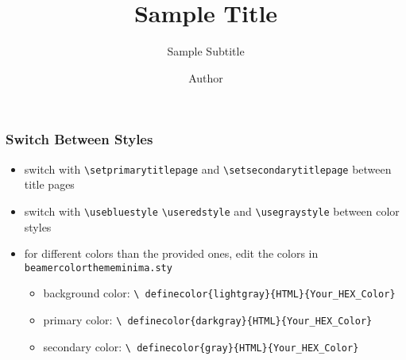 \title{Sample Title}
\subtitle{Sample Subtitle}
\author{Author}

\usebluestyle



	\setsecondayrtitlepage
	\begin{frame}
		\titlepage
	\end{frame}

	\setprimarytitlepage
	\begin{frame}
		\titlepage
	\end{frame}

	\begin{frame}
		\frametitle{Switch Between Styles}

		\begin{itemize}
			\item switch with \texttt{\textbackslash setprimarytitlepage} and \texttt{\textbackslash setsecondarytitlepage} between title pages
			\item switch with \texttt{\textbackslash usebluestyle} \texttt{\textbackslash useredstyle} and \texttt{\textbackslash usegraystyle} between color styles
			\item for different colors than the provided ones, edit the colors in \texttt{beamercolorthememinima.sty}
			\begin{itemize}
				\item background color: \texttt{\textbackslash
				definecolor\{lightgray\}\{HTML\}\{Your\_HEX\_Color\}}
				\item primary color: \texttt{\textbackslash
				definecolor\{darkgray\}\{HTML\}\{Your\_HEX\_Color\}}
				\item secondary color: \texttt{\textbackslash
				definecolor\{gray\}\{HTML\}\{Your\_HEX\_Color\}}
			\end{itemize}
		\end{itemize}
		\vspace{1em}
	\end{frame}

